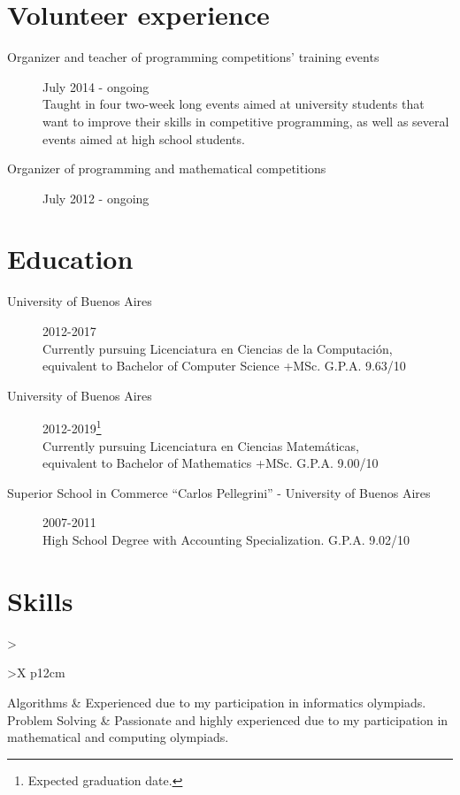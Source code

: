 \documentclass [a4paper, 11pt]{article}
\begin{document}
\section* {Volunteer experience}
\begin{description}
\item[Organizer and teacher of programming competitions' training events] {\hfill July 2014 - ongoing \\
  Taught in four two-week long events aimed at university students that 
  want to improve their skills in competitive programming, as well as 
  several events aimed at high school students. 
}
\item[Organizer of programming and mathematical competitions] { \hfill July 2012 - ongoing \\
}
\end{description}

\section* {Education}
\begin{description}
  \item[University of Buenos Aires]{\hfill 2012-2017 \\
	Currently pursuing Licenciatura en Ciencias de la Computaci\'on, \\
	equivalent to Bachelor of Computer Science +MSc. G.P.A. 9.63/10}

  \item[University of Buenos Aires]{\hfill 2012-2019\footnote{Expected graduation date.} \\
	Currently pursuing Licenciatura en Ciencias Matem\'aticas, \\
	equivalent to Bachelor of Mathematics +MSc. G.P.A. 9.00/10}
	
  \item[Superior School in Commerce ``Carlos Pellegrini'' - University of Buenos Aires] {\hfill 2007-2011 \\
	High School Degree with Accounting Specialization. G.P.A. 9.02/10}
\end{description}

\section* {Skills}

\begin {tabularx}{\textwidth}{>{\raggedright}>{\bfseries}X p{12cm}}
  Algorithms & Experienced due to my participation in informatics olympiads. \\
  Problem Solving & Passionate and highly experienced due to my participation in mathematical and computing olympiads.
\end {tabularx}
\end{document}
